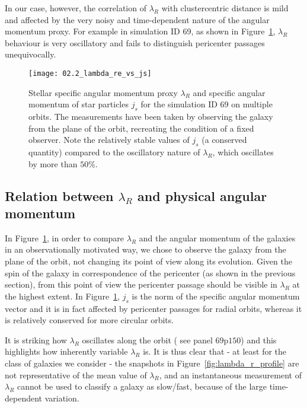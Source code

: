 In our case, however, the correlation of $\lambda_R$ with clustercentric distance is mild and affected by the very noisy and time-dependent nature of the angular momentum proxy.
For example in simulation ID 69, as shown in Figure~\ref{fig:lambda_r_j_s}, $\lambda_R$ behaviour is very oscillatory %
and fails to distinguish pericenter passages unequivocally.

\begin{figure}
  \centering
  \texttt{[image: 02.2\_lambda\_re\_vs\_js]}
  \caption{Stellar specific angular momentum proxy $\lambda_R$ and specific angular momentum of star particles $j_s$ for the simulation ID 69 on multiple orbits. The measurements have been taken by observing the galaxy from the plane of the orbit, recreating the condition of a fixed observer.
  Note the relatively stable values of $j_s$ (a conserved quantity) compared to the oscillatory nature of $\lambda_R$, which oscillates by more than $50$\%.}
  \label{fig:lambda_r_j_s}
\end{figure}

\subsection{Relation between $\lambda_R$ and physical angular momentum}
In Figure~\ref{fig:lambda_r_j_s}, in order to compare $\lambda_R$ and the angular momentum of the galaxies in an observationally motivated way, we chose to observe the galaxy from the plane of the orbit, not changing its point of view along its evolution.
Given the spin of the galaxy in correspondence of the pericenter (as shown in the previous section), from this point of view the pericenter passage should be visible in $\lambda_R$ at the highest extent.
In Figure~\ref{fig:lambda_r_j_s}, $j_s$ is the norm of the specific angular momentum vector and it is in fact affected by pericenter passages for radial orbits, whereas it is relatively conserved for more circular orbits.

It is striking how $\lambda_R$ oscillates along the orbit (\eg{} see panel $69$p$150$) and this highlights how inherently variable $\lambda_R$ is.
It is thus clear that - at least for the class of galaxies we consider - the snapshots in Figure~\ref{fig:lambda_r_profile} are not representative of the mean value of $\lambda_R$,
and an instantaneous measurement of $\lambda_R$ cannot be used to classify a galaxy as slow/fast, because of the large time-dependent variation.

